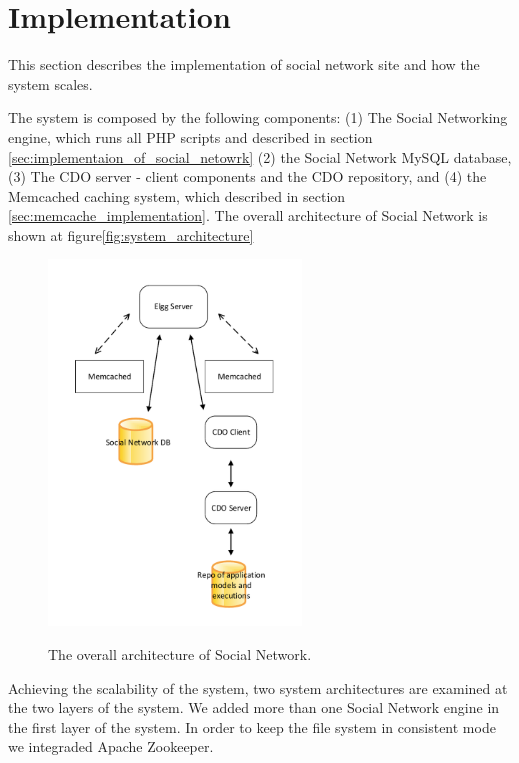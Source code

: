 \chapter{Implementation}

This section describes the implementation of social network site
and how the system scales.

The system is composed by the following components: (1) The Social Networking engine, which runs all PHP scripts and described in section \ref{sec:implementaion_of_social_netowrk} (2) the Social Network MySQL database, (3) The CDO server - client components and the CDO repository, and (4) the Memcached caching system, which described in section \ref{sec:memcache_implementation}.
The overall architecture of Social Network is shown at figure\ref{fig:system_architecture}

\begin{figure}[h]
	\caption{The overall architecture of Social Network.}
	\includegraphics[width=0.6\textwidth,natwidth=200,natheight=150]{./fig/system_architecture.pdf}
	\centering
	\label{fig:elgg_architecture}
\end{figure}

Achieving the scalability of the system, two system architectures are examined at the two layers of the system. We added more than one Social Network engine in the first layer of the system. In order to keep the file system in consistent mode we integraded Apache Zookeeper\cite{zookeeper_url}.

